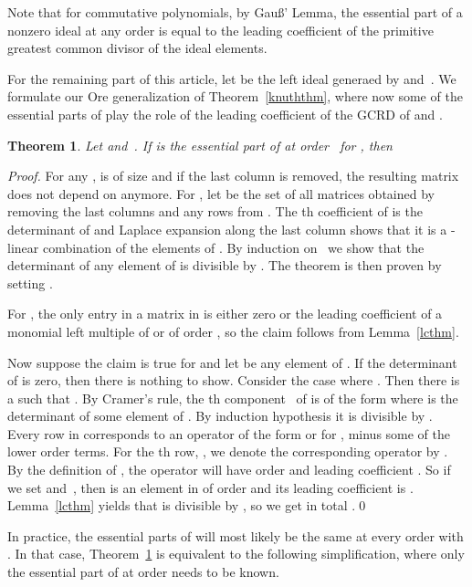 \documentclass[3p,11pt,preprint]{elsarticle}
\newtheorem{theorem}{Theorem}
\begin{document}
Note that for commutative polynomials, by Gau\ss' Lemma, the essential part of a nonzero ideal at any order is equal to the leading coefficient of the primitive greatest common divisor of the ideal elements. 

For the remaining part of this article, let  be the left ideal generaed by  and~. We formulate our Ore generalization of Theorem~\ref{knuththm}, where now some of the essential parts of  play the role of the leading coefficient of the GCRD of  and .

\begin{theorem}
\label{mainthm}
 Let  and~. If  is the essential part of  at order~ for , then

\end{theorem}

\begin{proof}
 For any ,  is of size  and if the last column is removed, the resulting matrix does not depend on  anymore. For , let  be the set of all  matrices obtained by removing the last  columns and any  rows from . The th coefficient of  is the determinant of  and Laplace expansion along the last column shows that it is a -linear combination of the elements of . By induction on~ we show that the determinant of any element of  is divisible by . The theorem is then proven by setting .

 For , the only entry in a matrix in  is either zero or the leading coefficient of a monomial left multiple of  or  of order , so the claim follows from Lemma~\ref{lcthm}.

 Now suppose the claim is true for  and let  be any element of . If the determinant of  is zero, then there is nothing to show. Consider the case where . 
Then there is a  such that . By Cramer's rule, the th component~ of  is of the form  where  is the determinant of some element of . By induction hypothesis it is divisible by . 
 Every row in  corresponds to an operator of the form  or  for , minus some of the lower order terms. For the th row, , we denote the corresponding operator by . By the definition of , the operator  will have order  and leading coefficient .
 So if we set  and~, then  is an element in  of order  and its leading coefficient is . Lemma~\ref{lcthm} yields that  is divisible by , so we get in total .\qed
\end{proof}

In practice, the essential parts of  will most likely be the same at every order  with . In that case, Theorem~\ref{mainthm} is equivalent to the following simplification, where only the essential part of  at order  needs to be known.
\end{document}
